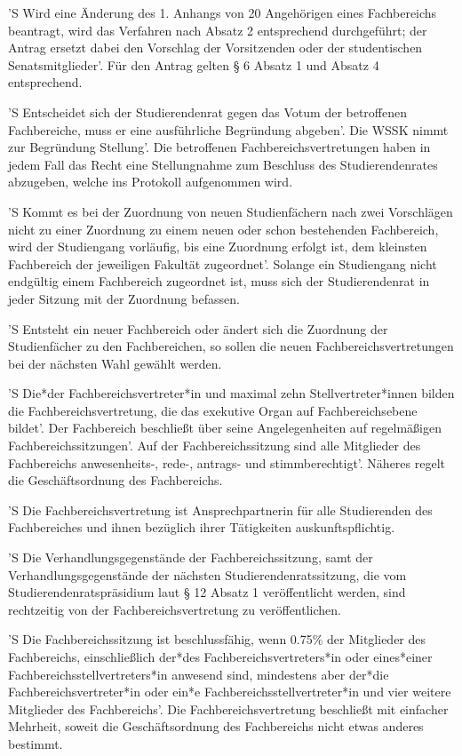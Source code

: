 \documentclass[fontsize=12pt,parskip=half]{scrartcl}
\begin{document}
\begin{contract}
  'S Wird eine Änderung des 1. Anhangs von 20 Angehörigen eines Fachbereichs
  beantragt, wird das Verfahren nach Absatz 2 entsprechend durchgeführt; der
  Antrag ersetzt dabei den Vorschlag der Vorsitzenden oder der studentischen
  Senatsmitglieder'. Für den Antrag gelten § 6 Absatz 1 und Absatz 4
  entsprechend.

  'S Entscheidet sich der Studierendenrat gegen das Votum der betroffenen
  Fachbereiche, muss er eine ausführliche Begründung abgeben'. Die WSSK nimmt zur
  Begründung Stellung'. Die betroffenen Fachbereichsvertretungen haben in jedem
  Fall das Recht eine Stellungnahme zum Beschluss des Studierendenrates
  abzugeben, welche ins Protokoll aufgenommen wird.

  'S Kommt es bei der Zuordnung von neuen Studienfächern nach zwei Vorschlägen
  nicht zu einer Zuordnung zu einem neuen oder schon bestehenden Fachbereich,
  wird der Studiengang vorläufig, bis eine Zuordnung erfolgt ist, dem kleinsten
  Fachbereich der jeweiligen Fakultät zugeordnet'. Solange ein Studiengang nicht
  endgültig einem Fachbereich zugeordnet ist, muss sich der Studierendenrat in
  jeder Sitzung mit der Zuordnung befassen.

  'S Entsteht ein neuer Fachbereich oder ändert sich die Zuordnung der
  Studienfächer zu den Fachbereichen, so sollen die neuen
  Fachbereichsvertretungen bei der nächsten Wahl gewählt werden.



  'S Die*der Fachbereichsvertreter*in und maximal zehn Stellvertreter*innen bilden
  die Fachbereichsvertretung, die das exekutive Organ auf Fachbereichsebene
  bildet'. Der Fachbereich beschließt über seine Angelegenheiten auf regelmäßigen
  Fachbereichssitzungen'. Auf der Fachbereichssitzung sind alle Mitglieder des
  Fachbereichs anwesenheits-, rede-, antrags- und stimmberechtigt'. Näheres
  regelt die Geschäftsordnung des Fachbereichs.

  'S Die Fachbereichsvertretung ist Ansprechpartnerin für alle Studierenden des
  Fachbereiches und ihnen bezüglich ihrer Tätigkeiten auskunftspflichtig.

  'S Die Verhandlungsgegenstände der Fachbereichssitzung, samt der
  Verhandlungsgegenstände der nächsten Studierendenratssitzung, die vom
  Studierendenratspräsidium laut § 12 Absatz 1 veröffentlicht werden, sind
  rechtzeitig von der Fachbereichsvertretung zu veröffentlichen.

  'S Die Fachbereichssitzung ist beschlussfähig, wenn 0.75\% der Mitglieder des
  Fachbereichs, einschließlich der*des Fachbereichsvertreters*in oder
  eines*einer Fachbereichsstellvertreters*in anwesend sind, mindestens aber
  der*die Fachbereichsvertreter*in oder ein*e Fachbereichsstellvertreter*in und
  vier weitere Mitglieder des Fachbereichs'. Die Fachbereichsvertretung
  beschließt mit einfacher Mehrheit, soweit die Geschäftsordnung des
  Fachbereichs nicht etwas anderes bestimmt.


\end{contract}
\end{document}
